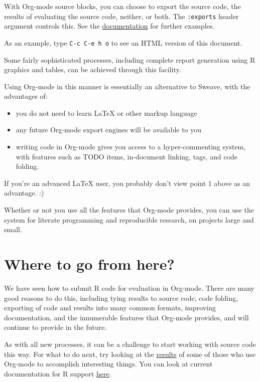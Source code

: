 \documentclass[11pt]{article}
\begin{document}
With Org-mode source blocks, you can choose to export the source code,
the results of evaluating the source code, neither, or both. The
\texttt{:exports} header argument controls this. See the \href{http://orgmode.org/manual/Exporting-code-blocks.html#Exporting-code-blocks}{documentation} for
further examples.

As an example, type \texttt{C-c C-e h o} to see an HTML version of this
document.

Some fairly sophisticated processes, including complete report
generation using R graphics and tables, can be achieved through this
facility.

Using Org-mode in this manner is essentially an alternative to Sweave,
with the advantages of:
\begin{itemize}
\item you do not need to learn \LaTeX{} or other markup language
\item any future Org-mode export engines will be available to you
\item writing code in Org-mode gives you access to a hyper-commenting
system, with features such as TODO items, in-document linking, tags,
and code folding.
\end{itemize}

If you're an advanced \LaTeX{} user, you probably don't view point 1
above as an advantage. :)

Whether or not you use all the features that Org-mode provides, you
can use the system for literate programming and reproducible research,
on projects large and small.
\section*{Where to go from here?}
\label{sec-10}

We have seen how to submit R code for evaluation in Org-mode. There
are many good reasons to do this, including tying results to source
code, code folding, exporting of code and results into many common
formats, improving documentation, and the innumerable features that
Org-mode provides, and will continue to provide in the future.

As with all new processes, it can be a challenge to start working with
source code this way.  For what to do next, try looking at the \href{http://orgmode.org/worg/org-contrib/babel/uses.html}{results}
of some of those who use Org-mode to accomplish interesting
things. You can look at current documentation for R support \href{http://orgmode.org/worg/org-contrib/babel/languages/ob-doc-R.html}{here}.
\end{document}
